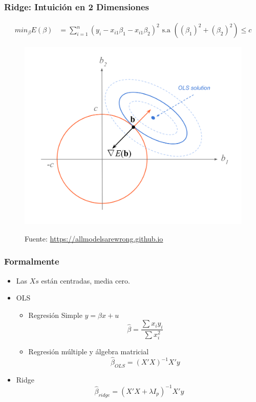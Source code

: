 \documentclass[
  shownotes,
  xcolor={svgnames},
  hyperref={colorlinks,citecolor=DarkBlue,linkcolor=andesred,urlcolor=DarkBlue}
  , aspectratio=169]{beamer}
\begin{document}
\begin{frame}[fragile]
\frametitle{Ridge: Intuición en 2 Dimensiones }

\begin{align}
     min_{\beta} E(\beta) &= \sum_{i=1}^n (y_i - x_{i1}\beta_1 - x_{i1}\beta_2)^2  \text{ s.a }   \left( (\beta_1)^2 + (\beta_2)^2 \right) \leq c 
  \end{align}

\begin{figure}[H] \centering
            \captionsetup{justification=centering}
              \includegraphics[scale=0.3]{figures/ridge4}
 
\tiny
Fuente: \url{https://allmodelsarewrong.github.io}
\end{figure}

\end{frame}
\begin{frame}[fragile]
\frametitle{Formalmente}



\begin{itemize}
  \item Las $Xs$ están centradas, media cero.
  \medskip
  \item OLS 
  \begin{itemize}
    \item Regresión Simple $y= \beta x + u$ 
        \begin{equation*}
          \hat{\beta}=\frac{\sum x_iy_i }{\sum x_i^2 }
        \end{equation*}
        \medskip
    \item Regresión múltiple y álgebra matricial
    \begin{equation*}
    \hat{\beta}_{OLS}  = (X'X)^{-1} X' y
    \end{equation*}
    
  \end{itemize}
  \item Ridge 
    \begin{equation*}
      \hat{\beta}_{ridge} = (X'X+\lambda I_p)^{-1} X' y
    \end{equation*}
\end{itemize}

\end{frame}
\end{document}

